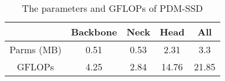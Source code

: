 

\begin{table}
	\centering
	\caption{The parameters and GFLOPs of PDM-SSD}
	\begin{tabular}{c|cccc} 
		\toprule
		& Backbone & Neck & Head  & All    \\ 
		\hline
		Parms (MB) & 0.51     & 0.53 & 2.31  & 3.3    \\
		GFLOPs     & 4.25     & 2.84 & 14.76 & 21.85  \\
		\bottomrule
	\end{tabular}
\label{tabel7}
\end{table}